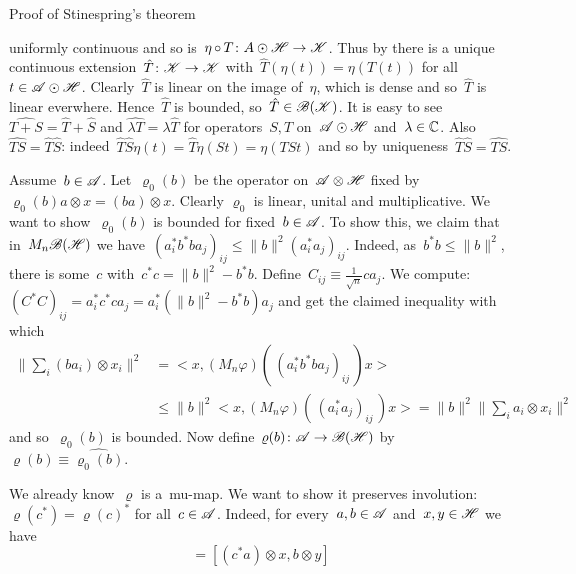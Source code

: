 \documentclass[b]{subfiles}
\begin{document}
\begin{parsec}
\begin{point}
\begin{point}{%
    Proof of Stinespring's theorem }
\begin{point}
uniformly continuous and so is~$\eta\mathop{\circ} T \colon A\odot\mathscr{H} \to\mathscr{K}$.
Thus by 
there is a unique continuous extension~$\hat{T} \colon \mathscr{K} \to \mathscr{K}$
with~$\hat{T}(\eta(t)) = \eta(T(t))$
    for all~$t \in \mathscr{A}\odot\mathscr{H}$.
Clearly~$\hat{T}$ is linear on the image of~$\eta$,
    which is dense and so~$\hat{T}$ is linear everwhere.
Hence~$\hat{T}$ is bounded, so~$\hat{T} \in \mathscr{B}(\mathscr{K})$.
It is easy to see~$\widehat{T+S}=\hat{T}+\hat{S}$ and
    $\widehat{\lambda T} = \lambda \hat{T}$
    for operators~$S,T$ on~$\mathscr{A} \odot \mathscr{H}$ and~$\lambda \in \mathbb{C}$.
Also~$\widehat{TS} = \hat{T}\hat{S}$:
indeed~$\hat{T}\hat{S} \eta(t)
            = \hat{T} \eta(St)
            = \eta(TSt)$
    and so by uniqueness~$\hat{T}\hat{S} = \widehat{TS}$.
\end{point}
\begin{point}%
    Assume~$b\in \mathscr{A}$.
    Let~$\varrho_0(b)$ be the operator on~$\mathscr{A} \otimes \mathscr{H}$
    fixed by~$\varrho_0(b) a\otimes x = (b a) \otimes x$.
Clearly $\varrho_0$ is linear, unital and multiplicative.
We want to show~$\varrho_0(b)$ is bounded for fixed~$b \in \mathscr{A}$.
To show this, we claim that in~$M_n\mathscr{B}(\mathscr{H})$
we have~$(a_i^*b^*ba_j)_{ij} \leq \|b\|^2 (a_i^*a_j)_{ij}$.
Indeed, as~$b^*b \leq \|b\|^2$,
    there is some~$c$ with~$c^*c = \|b\|^2 - b^*b$.
Define~$C_{ij} \equiv \frac{1}{\sqrt{n}} ca_j$.
We compute:
$ (C^*C)_{ij} = a_i^*c^*ca_j = a_i^* (\|b\|^2 - b^*b) a_j$
and get the claimed inequality with which
\begin{equation*}
    \begin{split}
    \bigl\| \sum_i (ba_i) \otimes x_i \bigr\|^2
    & = \bigl< x, (M_n\varphi)(\, (a_i^* b^*b a_j)_{ij}\,)x\bigr> \\
    &\leq \|b\|^2 \bigl< x, (M_n\varphi)(\, (a_i^* a_j)_{ij}\,)x\bigr>
    = \|b\|^2 \bigl\| \sum_i a_i \otimes x_i \bigr\|^2
    \end{split}
\end{equation*}
and so~$\varrho_0(b)$ is bounded.
Now define~$\varrho(b) \colon \mathscr{A} \to \mathscr{B}(\mathscr{H})$
    by~$\varrho(b) \equiv \widehat{\varrho_0(b)}$.
\end{point}
\begin{point}%
We already know~$\varrho$ is a~mu-map.
We want to show it preserves involution: $\varrho(c^*) = \varrho(c)^*$
for all~$c \in \mathscr{A}$.
Indeed, for every~$a,b \in \mathscr{A}$ and~$x,y \in \mathscr{H}$
    we have
    \begin{equation*}
        [\varrho_0(c^*) \, a\otimes x,b \otimes y]
        = [(c^* a)\otimes x,b \otimes y]

\end{equation*}
\end{point}
\end{point}
\end{point}
\end{parsec}
\end{document}
